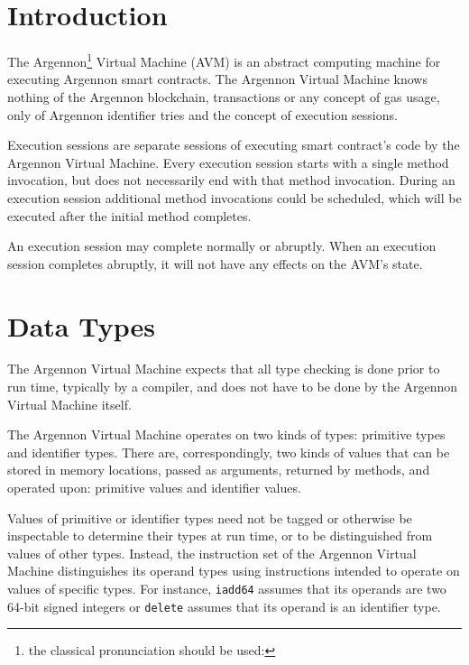 

\section{Introduction}\label{sec:introduction}

The Argennon\footnote{the classical pronunciation should be used:} Virtual Machine (AVM) is an
abstract computing machine for executing Argennon smart contracts. The
Argennon Virtual Machine knows nothing of the Argennon blockchain, transactions or any concept of gas usage, only of
Argennon identifier tries and the concept of execution sessions.

Execution sessions are separate sessions of executing smart contract's code by the Argennon Virtual Machine.
Every execution session starts with a single method invocation, but does not necessarily end with
that method invocation. During an execution session additional method invocations could be scheduled,
which will be executed after the initial method completes.

An execution session may complete normally or abruptly. When an execution session completes abruptly, it will
not have any effects on the AVM's state.

\section{Data Types}\label{sec:data-types}

The Argennon Virtual Machine expects that all type checking is done prior to run time, typically by a compiler,
and does not have to be done by the Argennon Virtual Machine itself.

The Argennon Virtual Machine operates on two kinds of types: primitive types and identifier types. There are,
correspondingly, two kinds of values that can be stored in memory locations, passed as arguments, returned by
methods, and operated upon: primitive values and identifier values.

Values of primitive or identifier types need not be tagged or otherwise be inspectable to determine their types
at run time, or to be distinguished from values of other types. Instead, the instruction set of the Argennon
Virtual Machine distinguishes its operand types using instructions intended to operate on values of specific
types. For instance, \texttt{iadd64} assumes that its operands are two 64-bit signed integers or \texttt{delete}
assumes that its operand is an identifier type.

